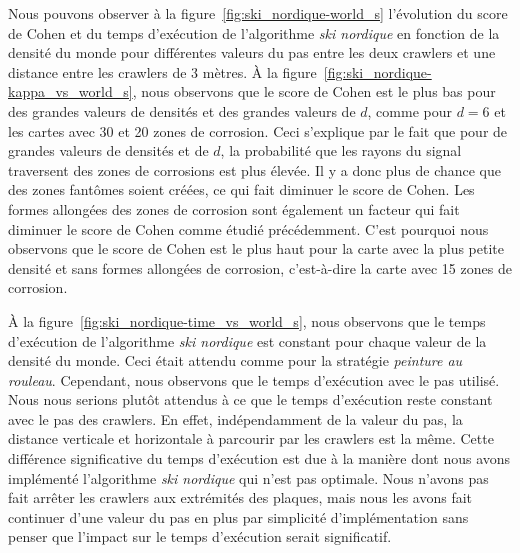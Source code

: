 \documentclass[francais,RandD]{rapportPFE}
\begin{document}
			Nous pouvons observer à la figure~\ref{fig:ski_nordique-world_s} l'évolution du score de Cohen et du temps d'exécution de l'algorithme \textit{ski nordique} en fonction de la densité du monde pour différentes valeurs du pas entre les deux crawlers et une distance entre les crawlers de 3 mètres.
			À la figure~\ref{fig:ski_nordique-kappa_vs_world_s}, nous observons que le score de Cohen est le plus bas pour des grandes valeurs de densités et des grandes valeurs de $d$, comme pour $d = 6$ et les cartes avec 30 et 20 zones de corrosion.
			Ceci s'explique par le fait que pour de grandes valeurs de densités et de $d$, la probabilité que les rayons du signal traversent des zones de corrosions est plus élevée.
			Il y a donc plus de chance que des zones fantômes soient créées, ce qui fait diminuer le score de Cohen.
			Les formes allongées des zones de corrosion sont également un facteur qui fait diminuer le score de Cohen comme étudié précédemment.
			C'est pourquoi nous observons que le score de Cohen est le plus haut pour la carte avec la plus petite densité et sans formes allongées de corrosion, c'est-à-dire la carte avec 15 zones de corrosion.

			À la figure~\ref{fig:ski_nordique-time_vs_world_s}, nous observons que le temps d'exécution de l'algorithme \textit{ski nordique} est constant pour chaque valeur de la densité du monde.
			Ceci était attendu comme pour la stratégie \textit{peinture au rouleau}.
			Cependant, nous observons que le temps d'exécution avec le pas utilisé.
			Nous nous serions plutôt attendus à ce que le temps d'exécution reste constant avec le pas des crawlers.
			En effet, indépendamment de la valeur du pas, la distance verticale et horizontale à parcourir par les crawlers est la même.
			Cette différence significative du temps d'exécution est due à la manière dont nous avons implémenté l'algorithme \textit{ski nordique} qui n'est pas optimale.
			Nous n'avons pas fait arrêter les crawlers aux extrémités des plaques, mais nous les avons fait continuer d'une valeur du pas en plus par simplicité d'implémentation sans penser que l'impact sur le temps d'exécution serait significatif.
\end{document}
